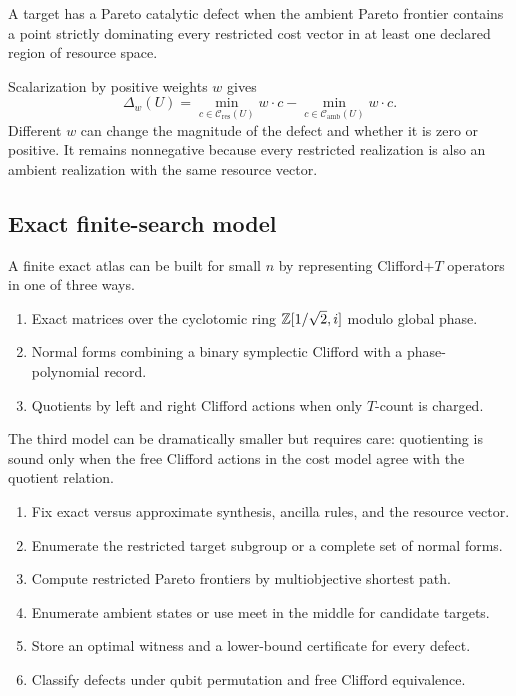 \begin{definition}
A target has a Pareto catalytic defect when the ambient Pareto frontier contains a point strictly dominating every restricted cost vector in at least one declared region of resource space.
\end{definition}

Scalarization by positive weights $w$ gives
\[
\Delta_w(U)=
\min_{c\in\mathcal C_{\mathrm{res}}(U)}w\cdot c
-
\min_{c\in\mathcal C_{\mathrm{amb}}(U)}w\cdot c.
\]
Different $w$ can change the magnitude of the defect and whether it is zero or positive.  It remains nonnegative because every restricted realization is also an ambient realization with the same resource vector.

\subsection{Exact finite-search model}
A finite exact atlas can be built \cite{g:KliuchnikovEtAl2013,g:AmyEtAl2013} for small $n$ by representing Clifford+$T$ operators in one of three ways.
\begin{enumerate}
\item Exact matrices over the cyclotomic ring $\mathbb Z[1/\sqrt2,i]$ modulo global phase.
\item Normal forms combining a binary symplectic Clifford with a phase-polynomial record.
\item Quotients by left and right Clifford actions when only $T$-count is charged.
\end{enumerate}
The third model can be dramatically smaller but requires care: quotienting is sound only when the free Clifford actions in the cost model agree with the quotient relation.

\begin{protocol}
\begin{enumerate}
\item Fix exact versus approximate synthesis, ancilla rules, and the resource vector.
\item Enumerate the restricted target subgroup or a complete set of normal forms.
\item Compute restricted Pareto frontiers by multiobjective shortest path.
\item Enumerate ambient states or use meet in the middle for candidate targets.
\item Store an optimal witness and a lower-bound certificate for every defect.
\item Classify defects under qubit permutation and free Clifford equivalence.
\end{enumerate}
\end{protocol}

